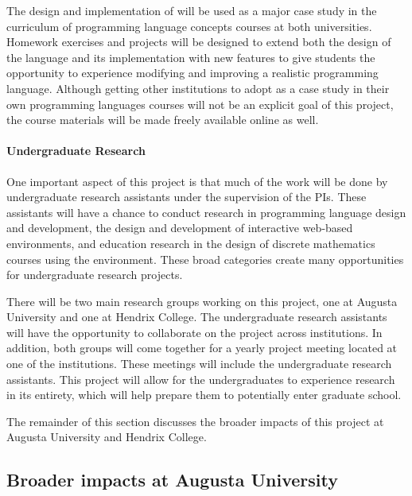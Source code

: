 The design and implementation of \thelang will be used as a major case
study in the curriculum of programming language concepts courses at
both universities.  Homework exercises and projects will be designed
to extend both the design of the language and its implementation with
new features to give students the opportunity to experience modifying
and improving a realistic programming language.  Although getting
other institutions to adopt \thelang as a case study in their own
programming languages courses will not be an explicit goal of this
project, the course materials will be made freely available online as
well.

\paragraph{Undergraduate Research} One important aspect of this project
is that much of the work will be done by undergraduate research
assistants under the supervision of the PIs.  These assistants will
have a chance to conduct research in programming language design and
development, the design and development of interactive web-based
environments, and education research in the design of discrete
mathematics courses using the \thelang environment.  These broad
categories create many opportunities for undergraduate research
projects.

There will be two main research groups working on this project, one at
Augusta University and one at Hendrix College.  The undergraduate
research assistants will have the opportunity to collaborate on the
project across institutions.  In addition, both groups will come
together for a yearly project meeting located at one of the
institutions.  These meetings will include the undergraduate research
assistants.  This project will allow for the undergraduates to
experience research in its entirety, which will help prepare them to
potentially enter graduate school.

The remainder of this section discusses the broader impacts of this
project at Augusta University and Hendrix College.

\subsection{Broader impacts at Augusta University}
\label{subsec:broader_impacts_at_augusta_university}

